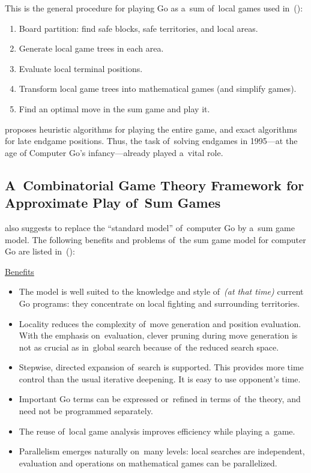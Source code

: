 This is the general procedure for playing Go as a~sum of~local games used in~(\cite{Muller1995computer}):
\begin{enumerate}
  \item Board partition: find safe blocks, safe territories, and local areas.
  \item Generate local game trees in each area.
  \item Evaluate local terminal positions.
  \item Transform local game trees into mathematical games (and simplify games).
  \item Find an optimal move in the sum game and play it.
\end{enumerate}
\Mueller proposes heuristic algorithms for playing the entire game, and exact algorithms for late endgame positions.
Thus, the task of~solving endgames in 1995---at the age of Computer Go's infancy---already played a~vital role.

\subsection{A~Combinatorial Game Theory Framework for Approximate Play of~Sum Games}

\Mueller also suggests to replace the ``standard model'' of~computer Go by a~sum game model.
The following benefits and problems of~the sum game model for computer Go are listed in~(\cite{Muller1995computer}):

\medskip

\underline{Benefits}
\begin{itemize}[+]
  \item The model is well suited to the knowledge and style of~\textit{(at that time)} current Go programs:
    they concentrate on local fighting and surrounding territories.
  \item Locality reduces the complexity of~move generation and position evaluation.
    With the emphasis on~evaluation, clever pruning during move generation is not as crucial as in~global search because of~the reduced search space.
  \item Stepwise, directed expansion of~search is supported.
    This provides more time control than the usual iterative deepening.
    It is easy to use opponent's time.
  \item Important Go terms can be expressed or~refined in terms of~the theory, and need not be programmed separately.
  \item The reuse of~local game analysis improves efficiency while playing a~game.
  \item Parallelism emerges naturally on~many levels: local searches are independent, evaluation and operations on mathematical games can be parallelized.
\end{itemize}

